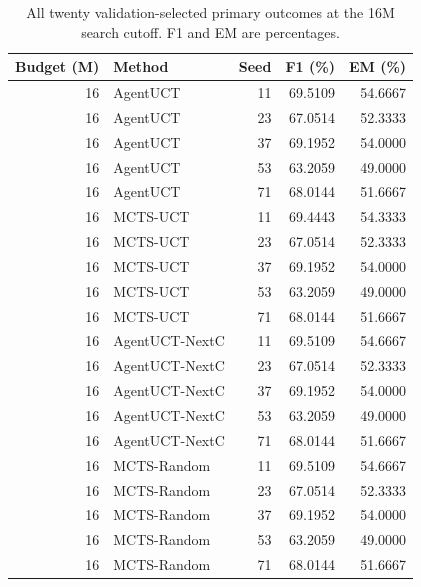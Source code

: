 \begin{table}[t]
\centering\small
\setlength{\tabcolsep}{4pt}
\caption{All twenty validation-selected primary outcomes at the 16M search cutoff. F1 and EM are percentages.}
\label{tab:seed-values-b16000000}
\begin{tabular}{rlrrr}
\toprule
Budget (M) & Method & Seed & F1 (\%) & EM (\%) \\
\midrule
16 & AgentUCT & 11 & 69.5109 & 54.6667 \\
16 & AgentUCT & 23 & 67.0514 & 52.3333 \\
16 & AgentUCT & 37 & 69.1952 & 54.0000 \\
16 & AgentUCT & 53 & 63.2059 & 49.0000 \\
16 & AgentUCT & 71 & 68.0144 & 51.6667 \\
16 & MCTS-UCT & 11 & 69.4443 & 54.3333 \\
16 & MCTS-UCT & 23 & 67.0514 & 52.3333 \\
16 & MCTS-UCT & 37 & 69.1952 & 54.0000 \\
16 & MCTS-UCT & 53 & 63.2059 & 49.0000 \\
16 & MCTS-UCT & 71 & 68.0144 & 51.6667 \\
16 & AgentUCT-NextC & 11 & 69.5109 & 54.6667 \\
16 & AgentUCT-NextC & 23 & 67.0514 & 52.3333 \\
16 & AgentUCT-NextC & 37 & 69.1952 & 54.0000 \\
16 & AgentUCT-NextC & 53 & 63.2059 & 49.0000 \\
16 & AgentUCT-NextC & 71 & 68.0144 & 51.6667 \\
16 & MCTS-Random & 11 & 69.5109 & 54.6667 \\
16 & MCTS-Random & 23 & 67.0514 & 52.3333 \\
16 & MCTS-Random & 37 & 69.1952 & 54.0000 \\
16 & MCTS-Random & 53 & 63.2059 & 49.0000 \\
16 & MCTS-Random & 71 & 68.0144 & 51.6667 \\
\bottomrule
\end{tabular}
\end{table}

